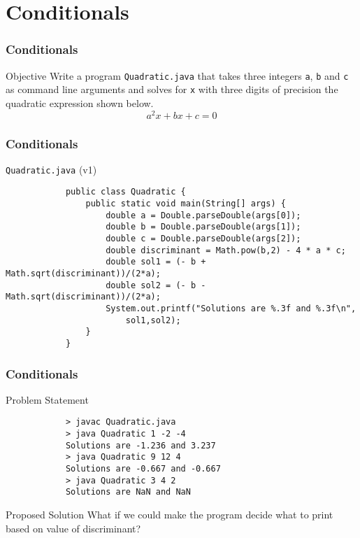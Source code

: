 \documentclass[10pt, compress]{beamer}
\begin{document}
\section{Conditionals}

\begin{frame}[fragile]
	\frametitle{Conditionals}
	\begin{block}{Objective}
		Write a program \texttt{Quadratic.java} that takes three integers \texttt{a}, \texttt{b} and \texttt{c} as command line arguments and solves for \texttt{x} with three digits of precision the quadratic expression shown below.
		\begin{equation*}\label{eq1}
			a^2 x + b x + c = 0
		\end{equation*}
	\end{block}
\end{frame}

\begin{frame}[fragile]
	\frametitle{Conditionals}
	\begin{block}{\texttt{Quadratic.java} (v1)}
		\begin{verbatim}
			public class Quadratic {
			    public static void main(String[] args) {
			        double a = Double.parseDouble(args[0]);
			        double b = Double.parseDouble(args[1]);
			        double c = Double.parseDouble(args[2]);
			        double discriminant = Math.pow(b,2) - 4 * a * c;
			        double sol1 = (- b + Math.sqrt(discriminant))/(2*a);
			        double sol2 = (- b - Math.sqrt(discriminant))/(2*a);
			        System.out.printf("Solutions are %.3f and %.3f\n",
			            sol1,sol2);
			    }
			}
		\end{verbatim}
	\end{block}
\end{frame}

\begin{frame}[fragile]
	\frametitle{Conditionals}
	\begin{block}{Problem Statement}
		\begin{verbatim}
			> javac Quadratic.java
			> java Quadratic 1 -2 -4
			Solutions are -1.236 and 3.237
			> java Quadratic 9 12 4
			Solutions are -0.667 and -0.667
			> java Quadratic 3 4 2
			Solutions are NaN and NaN
		\end{verbatim}
	\end{block}
	\begin{block}{Proposed Solution}
		What if we could make the program decide what to print based on value of discriminant?
	\end{block}
\end{frame}
\end{document}
